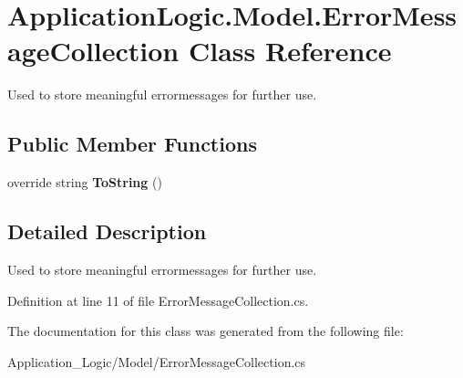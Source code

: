 \hypertarget{class_application_logic_1_1_model_1_1_error_message_collection}{
\section{ApplicationLogic.Model.ErrorMessageCollection Class Reference}
\label{class_application_logic_1_1_model_1_1_error_message_collection}
}


Used to store meaningful errormessages for further use.  


\subsection*{Public Member Functions}
\begin{DoxyCompactItemize}
\item 
\hypertarget{class_application_logic_1_1_model_1_1_error_message_collection_a49a334737f34ff0886bb784911f92b91}{
override string {\bfseries ToString} ()}
\label{class_application_logic_1_1_model_1_1_error_message_collection_a49a334737f34ff0886bb784911f92b91}

\end{DoxyCompactItemize}


\subsection{Detailed Description}
Used to store meaningful errormessages for further use. 

Definition at line 11 of file ErrorMessageCollection.cs.



The documentation for this class was generated from the following file:\begin{DoxyCompactItemize}
\item 
Application\_\-Logic/Model/ErrorMessageCollection.cs\end{DoxyCompactItemize}
